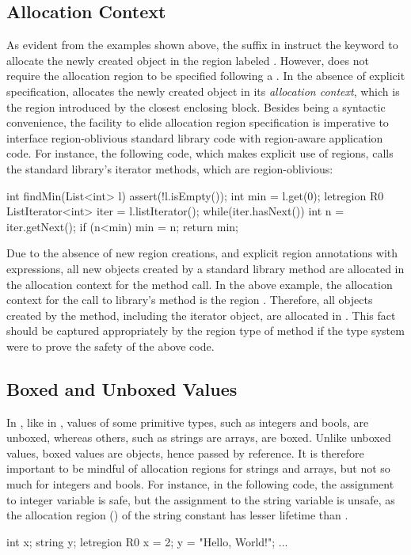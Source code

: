 \subsection{Allocation Context}

As evident from the examples shown above, the suffix  in
 instruct the  keyword to allocate the newly created
object in the region labeled . However, \name does not require
the allocation region to be specified following a . In the
absence of explicit specification, \name allocates the newly created
object in its \emph{allocation context}, which is the region
introduced by the closest enclosing  block. Besides being
a syntactic convenience, the facility to elide allocation region
specification is imperative to interface region-oblivious standard
library code with region-aware application code. For instance, the
following \name code, which makes explicit use of regions, calls
the standard library's iterator methods, which are region-oblivious:
\begin{center}
\begin{codejava}
  int findMin(List<int> l) {
    assert(!l.isEmpty());
    int min = l.get(0);
    letregion R0 {
      ListIterator<int> iter = l.listIterator();
      while(iter.hasNext()) {
        int n = iter.getNext();
        if (n<min) min = n;
      }
    }
    return min;
  }
\end{codejava}
\end{center}
Due to the absence of new region creations, and explicit region
annotations with  expressions, all new objects created by a
standard library method are allocated in the allocation context for
the method call. In the above example, the allocation context for the
call to  library's  method is the region
. Therefore, all objects created by the method, including the
iterator object, are allocated in . This fact should be captured
appropriately by the region type of  method if the
type system were to prove the safety of the above code.

\subsection{Boxed and Unboxed Values}

In \name, like in \csharp, values of some primitive types, such as
integers and bools, are unboxed, whereas others, such as strings are
arrays, are boxed. Unlike unboxed values, boxed values are objects,
hence passed by reference. It is therefore important to be mindful
of allocation regions for strings and arrays, but not so much for
integers and bools. For instance, in the following code, the
assignment to integer variable  is safe, but the assignment to
the string variable  is unsafe, as the allocation region ()
of the string constant has lesser lifetime than .
\begin{center}
\begin{codejava}
  int x;
  string y;
  letregion R0 {
    x = 2;
    y = "Hello, World!";
  }
  ...
\end{codejava}
\end{center}

